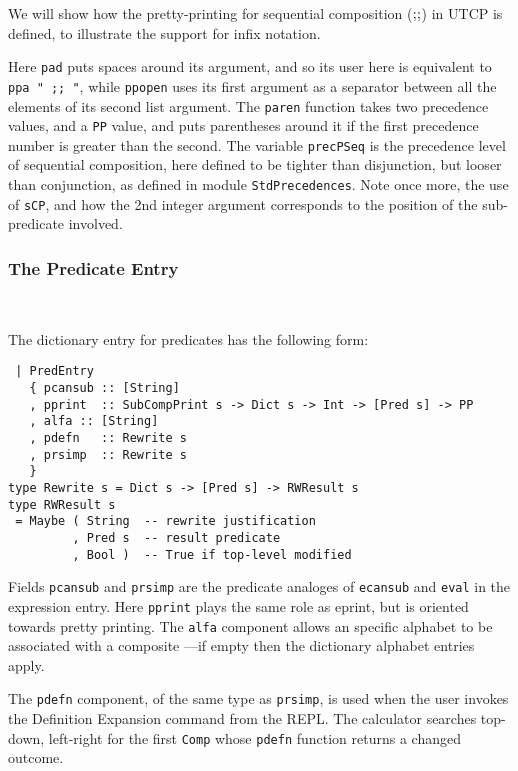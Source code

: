 We will show how the pretty-printing for
sequential composition  ($\mathrel{\mathbf{;\!;}}$) in UTCP is defined,
to illustrate the support for infix notation.
Here \texttt{pad} puts spaces around its argument,
and so its user here is equivalent to \verb$ppa " ;; "$,
while \texttt{ppopen} uses its first argument as a
separator between all the elements of its second list argument.
The \texttt{paren} function takes two precedence values,
and a \texttt{PP} value, and puts parentheses around it if the first precedence
number is greater than the second.
The variable \texttt{precPSeq} is the precedence level of sequential composition,
here defined to be tighter than disjunction,
but looser than conjunction, as defined in module \texttt{StdPrecedences}.
Note once more, the use of \texttt{sCP}, and how the 2nd integer argument
corresponds to the position of the sub-predicate involved.

\subsubsection{The Predicate Entry}~

The dictionary entry for predicates has the following form:
\begin{verbatim}
 | PredEntry
   { pcansub :: [String]
   , pprint  :: SubCompPrint s -> Dict s -> Int -> [Pred s] -> PP
   , alfa :: [String]
   , pdefn   :: Rewrite s
   , prsimp  :: Rewrite s
   }
type Rewrite s = Dict s -> [Pred s] -> RWResult s
type RWResult s
 = Maybe ( String  -- rewrite justification
         , Pred s  -- result predicate
         , Bool )  -- True if top-level modified
\end{verbatim}
Fields \texttt{pcansub} and \texttt{prsimp} are the predicate analoges
of \texttt{ecansub} and \texttt{eval} in the expression entry.
Here \texttt{pprint} plays the same role as eprint,
but is oriented towards pretty printing.
The \texttt{alfa} component allows an specific alphabet to
be associated with a composite
---if empty then the dictionary alphabet entries apply.

The \texttt{pdefn} component, of the same type as \texttt{prsimp},
is used when the user invokes the Definition Expansion
command from the REPL.
The calculator searches top-down, left-right
    for the first \texttt{Comp} whose \texttt{pdefn} function
    returns a changed outcome.


